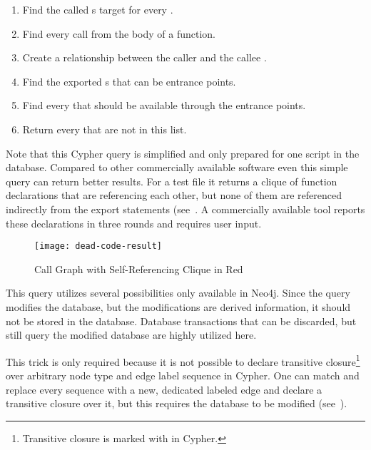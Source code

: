 \begin{enumerate}
	\item Find the called s target for every .
	\item Find every call from the body of a function.
	\item Create a  relationship between the caller and the callee .
	\item Find the exported s that can be entrance points.
	\item Find every  that should be available through the entrance points.
	\item Return every  that are not in this list.
\end{enumerate}

\begin{figure}[!htb]
	\begin{minipage}{\textwidth}
		
	\end{minipage}
\end{figure}

Note that this Cypher query is simplified and only prepared for one script in the database. Compared to other commercially available software even this simple query can return better results. For a test file it returns a clique of function declarations that are referencing each other, but none of them are referenced indirectly from the export statements (see~. A commercially available tool reports these declarations in three rounds and requires user input.

\begin{figure}[htbp]
  \centering
  \texttt{[image: dead-code-result]}
  \caption{Call Graph with Self-Referencing Clique in Red}
  \label{fig:dead-code-result}
\end{figure}

This query utilizes several possibilities only available in Neo4j. Since the query modifies the database, but the modifications are derived information, it should not be stored in the database. Database transactions that can be discarded, but still query the modified database are highly utilized here.

This trick is only required because it is not possible to declare transitive closure\footnote{Transitive closure is marked with \code{*} in Cypher.} over arbitrary node type and edge label sequence in Cypher. One can match and replace every sequence with a new, dedicated labeled edge and declare a transitive closure over it, but this requires the database to be modified (see~).

